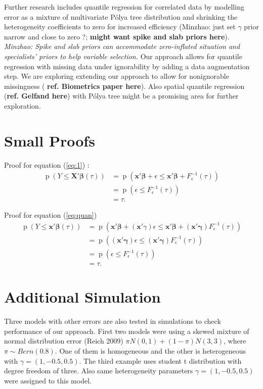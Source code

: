 \documentclass[12pt]{article}
\newcommand{\polya}{P\'{o}lya}
\DeclareMathOperator{\pr}{p}
\begin{document}
Further research includes quantile regression for correlated data by
modelling error as a mixture of multivariate \polya{} tree
distribution and shrinking the heterogeneity coefficients to zero for
increased efficiency (Minzhao: just set $\gamma$ prior narrow and
close to zero ?; {\bf might want spike and slab priors here}). {\it
  Minzhao: Spike and slab priors can accommodate zero-inflated
  situation and specialists' priors to help variable selection.} Our
approach allows for quantile regression with missing data under
ignorability by adding a data augmentation step.  We are exploring
extending our approach to allow for nonignorable missingness ({\bf
  ref. Biometrics paper here}).  Also spatial quantile regression
({\bf ref. Gelfand here}) with \polya{} tree might be a promising area
for further exploration.


% 


\appendix
\section{Small Proofs}

Proof for equation (\ref{eq:1}) :
\begin{align*}
  \pr (Y \le \bm{X'\beta}(\tau)) & = \pr \left( \bm{x'\beta} +
    \epsilon
    \le \bm{x'\beta} + F^{-1}_{\epsilon}(\tau) \right) \\
  & = \pr (\epsilon \le F^{-1}_{\epsilon}(\tau)) \\
  & = \tau.
\end{align*}

Proof for equation (\ref{eq:quan})
\begin{align*}
  \pr (Y \le \bm{x'\beta}(\tau)) & = \pr \left( \bm{x'\beta} +
    (\bm{x}'\gamma) \epsilon \le \bm{x'\beta} + (\bm{x'\gamma})
    F^{-1}_{\epsilon}(\tau) \right) \\
  & = \pr \left( (\bm{x'\gamma}) \epsilon \le (\bm{x'\gamma})
    F^{-1}_{\epsilon}(\tau)  \right)\\
  & = \pr (\epsilon \le F^{-1}_{\epsilon}(\tau)) \\
  & = \tau .
\end{align*}

\section{Additional Simulation}

Three models with other errors are also tested in simulations to check
performance of our approach. First two models were using a skewed
mixture of normal distribution error (Reich 2009) $\pi N(0,1) +
(1-\pi) N(3,3)$, where $\pi \sim Bern(0.8)$. One of them is
homogeneous and the other is heterogeneous with $\gamma=(1,
-0.5,0.5)$. The third example uses student t distribution with degree
freedom of three. Also same heterogeneity parameters $\gamma=(1,
-0.5,0.5)$ were assigned to this model.
\end{document}
